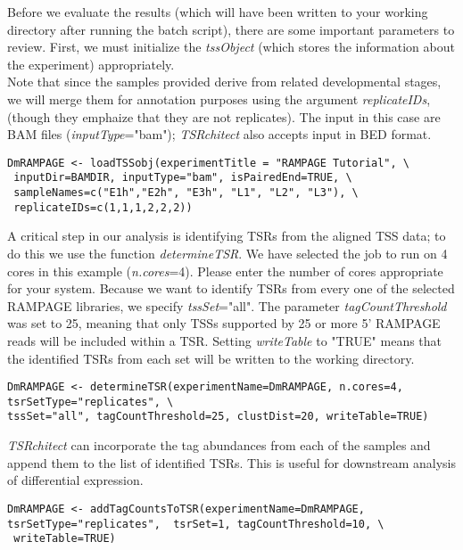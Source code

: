 \documentclass[runningheads,a4paper]{llncs}
\begin{document}
\begin{linenumbers}
\begin{itemize}
Before we evaluate the results (which will have been written to your working directory after running the batch script), there are some important parameters to review. 
First, we must initialize the \textit{tssObject} (which stores the information about the experiment) appropriately. \\

Note that since the samples provided derive from related developmental stages, we will merge them for annotation purposes using the argument \textit{replicateIDs}, (though they emphaize that they are not replicates).
The input in this case are BAM files (\textit{inputType}="bam"); \textit{TSRchitect} also accepts input in BED format.

\noindent
\begin{verbatim}
DmRAMPAGE <- loadTSSobj(experimentTitle = "RAMPAGE Tutorial", \
 inputDir=BAMDIR, inputType="bam", isPairedEnd=TRUE, \
 sampleNames=c("E1h","E2h", "E3h", "L1", "L2", "L3"), \
 replicateIDs=c(1,1,1,2,2,2))
\end{verbatim}

A critical step in our analysis is identifying TSRs from the aligned TSS data; to do this we use the function \textit{determineTSR}. 
We have selected the job to run on 4 cores in this example (\textit{n.cores}=4). 
Please enter the number of cores appropriate for your system.
Because we want to identify TSRs from every one of the selected RAMPAGE libraries, we specify \textit{tssSet}="all".
The parameter \textit{tagCountThreshold} was set to 25, meaning that only TSSs supported by 25 or more 5' RAMPAGE reads will be included within a TSR.
Setting \textit{writeTable} to "TRUE" means that the identified TSRs from each set will be written to the working directory. 

\noindent
\begin{verbatim}
DmRAMPAGE <- determineTSR(experimentName=DmRAMPAGE, n.cores=4, tsrSetType="replicates", \
tssSet="all", tagCountThreshold=25, clustDist=20, writeTable=TRUE)
\end{verbatim}

\textit{TSRchitect} can incorporate the tag abundances from each of the samples and append them to the list of identified TSRs. 
This is useful for downstream analysis of differential expression.

\noindent
\begin{verbatim}
DmRAMPAGE <- addTagCountsToTSR(experimentName=DmRAMPAGE, 
tsrSetType="replicates",  tsrSet=1, tagCountThreshold=10, \
 writeTable=TRUE)
\end{verbatim}


\end{itemize}
\end{linenumbers}
\end{document}
